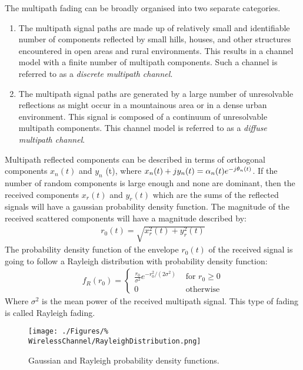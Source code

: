 The multipath fading can be broadly organised into %
two separate categories\cite{Jer00}.
\begin{enumerate}
	\item{The multipath signal paths are made up %
		of relatively small and identifiable number %
		of components reflected by small hills, %
		houses, and other structures encountered in %
		open areas and rural environments. This %
		results in a channel model with a finite number %
		of multipath components. Such a channel is %
		referred to as a \emph{discrete multipath channel}.}
	\item{The multipath signal paths are generated by %
		a large number of unresolvable reflections as %
		might occur %
		in a mountainous area or in a dense urban %
		environment. %
		This signal is composed of a continuum of %
		unresolvable multipath components. This %
		channel model is referred to as a \emph{diffuse %
		multipath channel}.}
\end{enumerate}
Multipath reflected components can be described in %
terms of orthogonal components $x_{n}(t)$ and %
$y_{n}$%
(t), where $x_{n}(t) + jy_{n}(t) = \alpha_{n}(t)e^{%
-j\theta_{n}(t)}$. If the number of random components %
is large enough and none are dominant, then the received %
components $x_{r}(t)$ and $y_{r}(t)$ which are the sums %
of the reflected signals will have a gaussian probability %
density function. The magnitude of the received scattered %
components will have a magnitude described by:
\begin{align}
	r_{0}(t) = \sqrt{x_{r}^{2}(t) + y_{r}^{2}(t)}
\end{align}
The probability density function of the envelope $r_{0}(t)$ %
of the received signal is going to follow a Rayleigh distribution %
with probability density function:
\begin{align}
	f_{R}(r_{0}) = \begin{cases}
		\frac{r_{0}}{\sigma^{2}}e^{-r_{0}^{2}/(2\sigma^{2})} %
		& \text{ for } r_{0} \geq 0 \\
		0 & \text{ otherwise}
	\end{cases}
	\label{eq:RayleighPDF}
\end{align}
Where $\sigma^{2}$ is the mean power of the received %
multipath signal. This type of fading is called Rayleigh %
fading.
\begin{figure}[h!]
	\centering
	\texttt{[image: ./Figures/\%
	WirelessChannel/RayleighDistribution.png]}
	\caption{Gaussian and Rayleigh probability 
	density functions.%
	\cite{Jakes74}}
	\label{fig:RayleighDistribution}
\end{figure}

